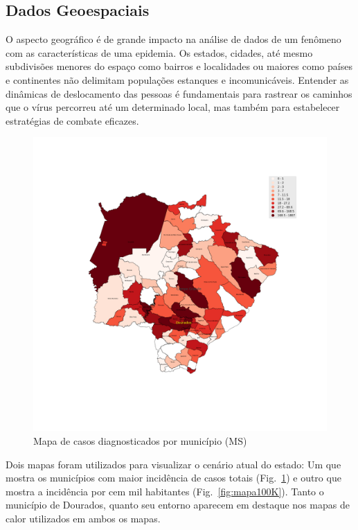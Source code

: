 \documentclass[12pt]{article}
\begin{document}
\subsection{Dados Geoespaciais}\label{ssec:geo}

O aspecto geográfico é de grande impacto na análise de dados de um fenômeno com as características de uma epidemia. Os estados, cidades, até mesmo subdivisões menores do espaço como bairros e localidades ou maiores como países e  continentes não delimitam populações estanques e incomunicáveis. Entender as dinâmicas de deslocamento das pessoas é fundamentais para rastrear os caminhos que o vírus percorreu até um determinado local, mas também para estabelecer estratégias de combate eficazes.

\begin{figure}[!htb]
  \centering
  \includegraphics[width=1\textwidth]{figs/mapa_casos_registrados.png}
  \caption{Mapa de casos diagnosticados por município (MS)}
  \label{fig:mapaCasos}
  \end{figure}

Dois mapas foram utilizados para visualizar o cenário atual do estado: Um que mostra os municípios com maior incidência de casos totais (Fig.~\ref{fig:mapaCasos}) e outro que mostra a incidência por cem mil habitantes (Fig.~\ref{fig:mapa100K}). Tanto o município de Dourados, quanto seu entorno aparecem em destaque nos mapas de calor utilizados em ambos os mapas.
\end{document}
